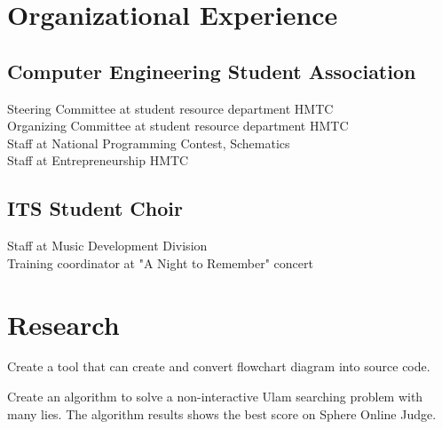 \documentclass[letterpaper]{deedy-resume} %
\begin{document}
\hfill
\begin{minipage}[t]{0.59\textwidth} %


\section{Organizational Experience}

\subsection{Computer Engineering Student Association}
  Steering Committee at student resource department HMTC \\
  Organizing Committee at student resource department HMTC \\
  Staff at National Programming Contest, Schematics \\
  Staff at Entrepreneurship HMTC \\
\sectionspace

\subsection{ITS Student Choir}
  Staff at Music Development Division \\
  Training coordinator at "A Night to Remember" concert \\
\sectionspace


\section{Research}

Create a tool that can create and convert flowchart diagram into source code.
\sectionspace

Create an algorithm to solve a non-interactive Ulam searching problem with many lies. The algorithm results shows the best score on Sphere Online Judge.
\sectionspace

\end{minipage} %

\end{document}

